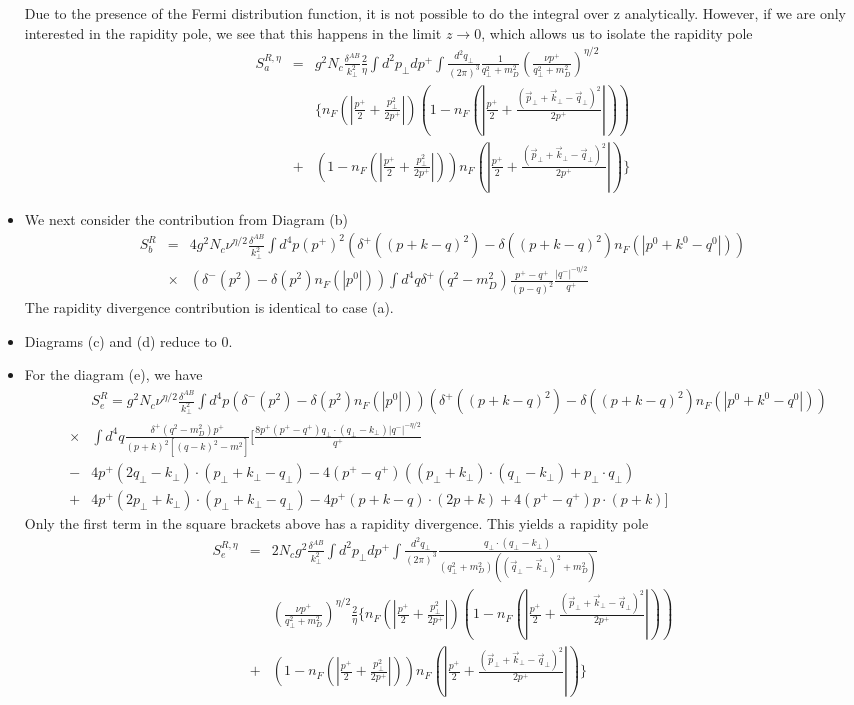 \documentclass[letter,11pt]{article}
\newcommand{\nn}{\nonumber}
\newcommand{\bea}{\begin{eqnarray}}
\newcommand{\eea}{\end{eqnarray}}
\def\nn{\nonumber}
\begin{document}
\begin{itemize}
Due to the presence of the Fermi distribution function, it is not possible to do the integral over z analytically. However, if we are only interested in the rapidity pole, we see that this happens in the limit $z \rightarrow 0$, which allows us to isolate the rapidity pole
\bea
S_a^{R,\eta}&=& g^2N_c\frac{\delta^{AB}}{k_{\perp}^2}\frac{2}{\eta}\int d^2p_{\perp}dp^+ \int \frac{d^2q_{\perp}}{(2\pi)^{3}}\frac{1}{q_{\perp}^2+m_D^2}\left(\frac{\nu p^+}{q_{\perp}^2+m_D^2}\right)^{\eta/2}\nn\\
&&\Bigg\{n_F(|\frac{p^+}{2}+\frac{p_{\perp}^2}{2p^+}|)\left(1-n_F(|\frac{p^+}{2}+\frac{(\vec{p}_{\perp}+\vec{k}_{\perp}-\vec{q}_{\perp})^2}{2p^+}|)\right)\nn\\
 &+&(1-n_F(|\frac{p^+}{2}+\frac{p_{\perp}^2}{2p^+}|))n_F(|\frac{p^+}{2}+\frac{(\vec{p}_{\perp}+\vec{k}_{\perp}-\vec{q}_{\perp})^2}{2p^+}|)\Bigg\}
\eea

\item
We next consider the contribution from Diagram (b) 
\bea
S_b^R&= & 4g^2N_c\nu^{\eta/2}\frac{\delta^{AB}}{k_{\perp}^2}\int d^4p(p^+)^2\left(\delta^+((p+k-q)^2)-\delta((p+k-q)^2)n_F(|p^0+k^0-q^0|)\right)\nn\\
&\times&\left( \delta^-(p^2)-\delta(p^2)n_F(|p^0|)\right) \int d^4q \delta^+(q^2-m_D^2)\frac{p^+-q^+}{(p-q)^2}\frac{|q^-|^{-\eta/2}}{q^+}
\eea
The rapidity divergence contribution is identical to case (a).

\item{}
Diagrams (c) and (d) reduce to 0. 

\item{}
For the diagram (e), we have 
\small
\bea
  &&S_e^R= g^2N_c\nu^{\eta/2}\frac{\delta^{AB}}{k_{\perp}^2}\int d^4p\left( \delta^-(p^2)-\delta(p^2)n_F(|p^0|)\right)\left(\delta^+((p+k-q)^2)-\delta((p+k-q)^2)n_F(|p^0+k^0-q^0|)\right)\nn\\
&\times& \int d^4q \frac{\delta^+(q^2-m_D^2)p^+}{(p+k)^2[(q-k)^2-m^2]}\Big[\frac{8p^+(p^+-q^+)q_{\perp}\cdot(q_{\perp}-k_{\perp})|q^-|^{-\eta/2}}{q^+}\nn\\
&-&4p^+(2q_{\perp}-k_{\perp})\cdot(p_{\perp}+k_{\perp}-q_{\perp})-4(p^+-q^+)((p_{\perp}+k_{\perp})\cdot(q_{\perp}-k_{\perp})+p_{\perp}\cdot q_{\perp})\nn\\
&+&4p^+(2p_{\perp}+k_{\perp})\cdot(p_{\perp}+k_{\perp}-q_{\perp})-4p^+(p+k-q)\cdot(2p+k)+4(p^+-q^+)p\cdot(p+k)\Big]
\eea
\normalsize
 Only the first term in the square brackets above has a rapidity divergence. This yields a rapidity pole
 \bea
S_e^{R,\eta}&=&   2N_cg^2\frac{\delta^{AB}}{k_{\perp}^2}\int d^2p_{\perp}dp^+\int \frac{d^2q_{\perp}}{(2\pi)^3}\frac{q_{\perp}\cdot(q_{\perp}-k_{\perp})}{(q_{\perp}^2+m_D^2)((\vec{q}_{\perp}-\vec{k}_{\perp})^2+m_D^2)}\nn\\
&&\left(\frac{\nu p^+}{q_{\perp}^2+m_D^2}\right)^{\eta/2}\frac{2}{\eta}\Bigg\{n_F(|\frac{p^+}{2}+\frac{p_{\perp}^2}{2p^+}|)\left(1-n_F(|\frac{p^+}{2}+\frac{(\vec{p}_{\perp}+\vec{k}_{\perp}-\vec{q}_{\perp})^2}{2p^+}|)\right)\nn\\
 &+&(1-n_F(|\frac{p^+}{2}+\frac{p_{\perp}^2}{2p^+}|))n_F(|\frac{p^+}{2}+\frac{(\vec{p}_{\perp}+\vec{k}_{\perp}-\vec{q}_{\perp})^2}{2p^+}|)\Bigg\}
\eea


\end{itemize}
\end{document}
